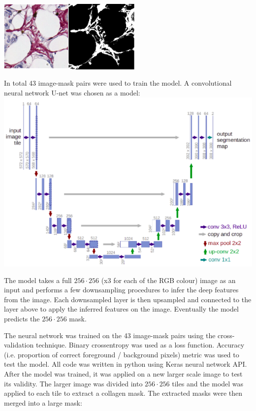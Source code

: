 \documentclass{article}
\begin{document}
\includegraphics[width=7cm]{images/pair.png}

In total 43 image-mask pairs were used to train the model. A convolutional neural network U-net was chosen as a model: \\

\includegraphics[width=\textwidth]{images/unet.png}

The model takes a full $256 \cdot 256$ (x3 for each of the RGB colour)
image as an input and performs a few downsampling procedures to infer the
deep features from the image. Each downsampled layer is then upsampled and
connected to the layer above to apply the inferred features on the image.
Eventually the model predicts the $256 \cdot 256$ mask.

The neural network was trained on the 43 image-mask pairs using the
cross-validation technique. Binary crossentropy was used as a loss function.
Accuracy (i.e. proportion of correct foreground / background pixels) metric
was used to test the model. All code was written in python using Keras
neural network API. After the model was trained, it was applied on a new
larger scale image to test its validity. The larger image was divided
into $256 \cdot 256$ tiles and the model was applied to each tile to extract
a collagen mask. The extracted masks were then merged into a large mask: \\
\end{document}
